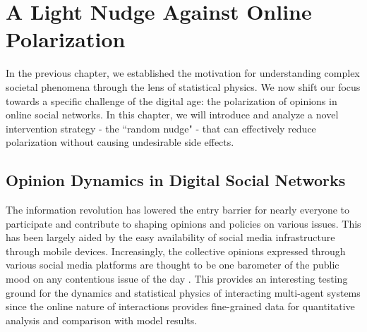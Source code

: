 \chapter{A Light Nudge Against Online Polarization}
\label{chap2}

In the previous chapter, we established the motivation for understanding complex societal phenomena through the lens of statistical physics. We now shift our focus towards a specific challenge of the digital age: the polarization of opinions in online social networks. In this chapter, we will introduce and analyze a novel intervention strategy - the ``random nudge" - that can effectively reduce polarization without causing undesirable side effects.

\section{Opinion Dynamics in Digital Social Networks}

The information revolution has lowered the entry barrier for nearly everyone to participate and contribute to shaping opinions and policies on various issues. This has been largely aided by the easy availability of social media infrastructure through mobile devices. Increasingly, the collective opinions expressed through various social media platforms are thought to be one barometer of the public mood on any contentious issue of the day \cite{social-media-as-public-opinion}. This provides an interesting testing ground for the dynamics and statistical physics of interacting multi-agent systems since the online nature of interactions provides fine-grained data for quantitative analysis and comparison with model results.

